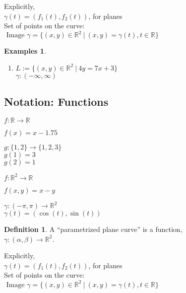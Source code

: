 \documentclass[twocolumn,20pt,fleqn]{extarticle}
\newcommand{\sep}{\vspace{0.5cm}}
\theoremstyle{plain}
\theoremstyle{definition}
\newtheorem*{definition}{Definition}
\newtheorem*{exmpls}{Examples}
\theoremstyle{remark}
\newenvironment*{examples}{\begin{exmpls} ~ \begin{enumerate}}{\end{enumerate}\end{exmpls}}
\begin{document}
Explicitly,\\
$\gamma(t) = (f_1(t), f_2(t))$, for planes\\

Set of points on the curve:\\  $\textrm{ Image } \gamma = \{(x,y) \in \mathbb{R}^2 \ |\ (x,y) = \gamma(t), t \in \mathbb{R}\}$




\begin{examples}
  \item $L:=\{(x,y) \in \mathbb{R}^2\ |\ 4y = 7x + 3\}$\\
  $\gamma  : (-\infty,\infty) $\end{examples}


\clearpage




\subsection{Notation: Functions}

$ f: \mathbb{R}  \to \mathbb{R}$

$f(x) = x - 1.75$\\

\sep

  $g : \{1,2\} \to \{1,2,3\}$\\
    $g(1) = 3$\\
    $g(2) = 1$\\

\sep

$ f: \mathbb{R}^2  \to \mathbb{R}$

$f(  x,y  ) = x - y$


\sep

$\gamma :  (-\pi,\pi)  \to \mathbb{R}^2$\\
$\gamma(t) = (\cos(t), \sin(t))$



\newpage



\begin{definition}
  A  ``parametrized plane curve''  is a  function,\\ $\gamma  : (\alpha, \beta) \to \mathbb{R}^2$.
\end{definition}

Explicitly,\\
$\gamma(t) = (f_1(t), f_2(t))$, for planes\\

Set of points on the curve:\\  $\textrm{ Image } \gamma = \{(x,y) \in \mathbb{R}^2 \ |\ (x,y) = \gamma(t), t \in \mathbb{R}\}$
\end{document}
